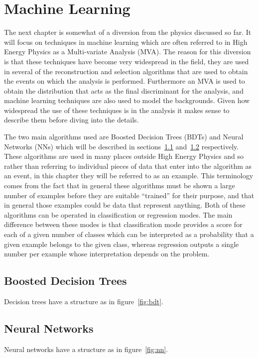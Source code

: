 \chapter{Machine Learning}%
\label{ch:ml}

The next chapter is somewhat of a diversion from the physics discussed so far.
It will focus on techniques in machine learning which are often referred to in
High Energy Physics as a Multi-variate Analysis (MVA). The reason for this
diversion is that these techniques have become very widespread in the field,
they are used in several of the reconstruction and selection algorithms that are
used to obtain the events on which the analysis is performed. Furthermore an MVA
is used to obtain the distribution that acts as the final discriminant for the
analysis, and machine learning techniques are also used to model the
backgrounds. Given how widespread the use of these techniques is in the analysis
it makes sense to describe them before diving into the details.

The two main algorithms used are Boosted Decision Trees (BDTs) and Neural
Networks (NNs) which will be described in sections~\ref{sec:bdts}
and~\ref{sec:neural-networks} respectively. These algorithms are used in many
places outside High Energy Physics and so rather than referring to individual
pieces of data that enter into the algorithm as an event, in this chapter they
will be referred to as an example. This terminology comes from the fact that in
general these algorithms must be shown a large number of examples before they
are suitable ``trained'' for their purpose, and that in general those examples
could be data that represent anything. Both of these algorithms can be operated
in classification or regression modes. The main difference between these modes
is that classification mode provides a score for each of a given number of
classes which can be interpreted as a probability that a given example belongs
to the given class, whereas regression outputs a single number per example whose
interpretation depends on the problem.

\section{Boosted Decision Trees}%
\label{sec:bdts}
Decision trees have a structure as in figure~\ref{fig:bdt}.


\section{Neural Networks}%
\label{sec:neural-networks}
Neural networks have a structure as in figure~\ref{fig:nn}.

